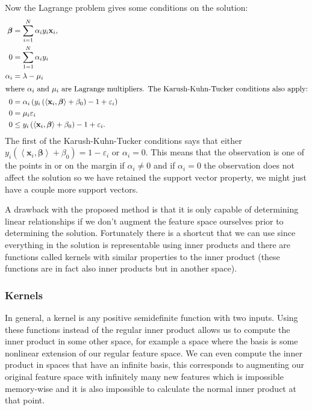 \documentclass[a4paper, 12pt]{scrartcl}
\newcommand{\bfbeta}{\boldsymbol{\beta}}
\newcommand{\bfx}{\mathbf{x}}
\newcommand{\inner}[2]{\left\langle #1, #2 \right\rangle}
\begin{document}
\begin{algorithm}
Now the Lagrange problem gives some conditions on the solution:
\begin{align*}
		\bfbeta&=\sum_{i=1}^{N}\alpha_iy_i\bfx_i,\\
		0&=\sum_{1=1}^{N}\alpha_iy_i\\
		\alpha_i&=\lambda-\mu_i\\
\intertext{where $\alpha_i$ and $\mu_i$ are Lagrange multipliers.
The Karush-Kuhn-Tucker conditions also apply:}
	0&=\alpha_i\left(y_i\left(\inner{\bfx_i}{\bfbeta}+\beta_0\right)-1+\varepsilon_i\right)\\
0&=\mu_i\varepsilon_i\\
0&\leq y_i\left(\inner{\bfx_i}{\bfbeta}+\beta_0\right)-1+\varepsilon_i.
\end{align*}
The first of the Karush-Kuhn-Tucker conditions says that either $y_i\left(\inner{\bfx_i}{\bfbeta}+\beta_0\right)=1-\varepsilon_i$ or  $\alpha_i=0$.
This means that the observation is one of the points in or on the margin if $\alpha_i\neq0$ and if $\alpha_i=0$ the observation does not affect the solution so we have retained the support vector property, we might just have a couple more support vectors.
\end{algorithm}

A drawback with the proposed method is that it is only capable of determining linear relationships if we don't augment the feature space ourselves prior to determining the solution.
Fortunately there is a shortcut that we can use since everything in the solution is representable using inner products and there are functions called kernels with similar properties to the inner product (these functions are in fact also inner products but in another space).

\subsubsection*{Kernels}
In general, a kernel is any positive semidefinite function with two inputs.
Using these functions instead of the regular inner product allows us to compute the inner product in some other space, for example a space where the basis is some nonlinear extension of our regular feature space.
We can even compute the inner product in spaces that have an infinite basis, this corresponds to augmenting our original feature space with infinitely many new features which is impossible memory-wise and it is also impossible to calculate the normal inner product at that point.
\end{document}
